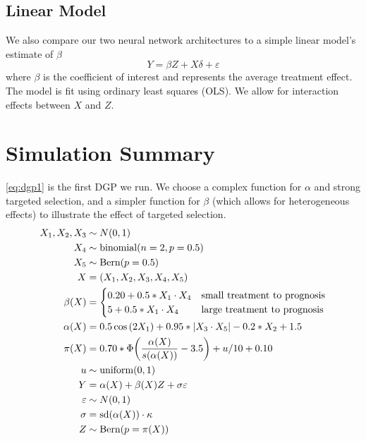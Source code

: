 \documentclass[11pt,  dvipsnames, table, x11name]{article}
\begin{document}
	\subsection{Linear Model}
	We also compare our two neural network architectures to a simple linear model's estimate of $\beta$
	\begin{equation}
		Y=\beta Z+X\delta +\varepsilon
		\label{eq:linmod_eq}
	\end{equation}
	where $\beta$ is the coefficient of interest and represents the average treatment effect. The model is fit using ordinary least squares (OLS).  We allow for interaction effects between $X$ and $Z$.
	
	
	
	
	\section{Simulation Summary}
	\autoref{eq:dgp1} is the first DGP we run. We choose a complex function for $\alpha$ and strong targeted selection, and a simpler function for $\beta$ (which allows for heterogeneous effects) to illustrate the effect of targeted selection.  
	\begin{align}
		\begin{split}
			X_1, X_2, X_3&\sim N(0,1)\\
			X_4&\sim \text{binomial}(n=2, p=0.5)\\
			X_5 &\sim \text{Bern}(p=0.5)\\
			X &= \qty(X_1, X_2, X_3, X_4, X_5)\\
			\beta\qty(X) &= \begin{cases}
				0.20+0.5*X_1\cdot X_4& \text{small treatment to prognosis}\\
				5+0.5*X_1\cdot X_4& \text{large treatment to prognosis}\\
			\end{cases}\\
			\alpha\qty(X)&=0.5\cos\qty(2X_1)+0.95*\abs{X_3\cdot X_5}-0.2*X_2+1.5\\
			\pi(X) &= 0.70*\Phi\qty(\frac{\alpha(X)}{s(\alpha(X))}-3.5)+u/10+0.10\\
			u&\sim \text{uniform}(0,1)\\
			Y&= \alpha(X)+\beta(X)Z+\sigma\varepsilon\\
			\varepsilon &\sim N(0,1)\\
			\sigma  &= \text{sd}(\alpha(X))\cdot \kappa \\
			Z &\sim \text{Bern}(p=\pi(X))
		\end{split}
		\label{eq:dgp1}
	\end{align}
	
\end{document}
